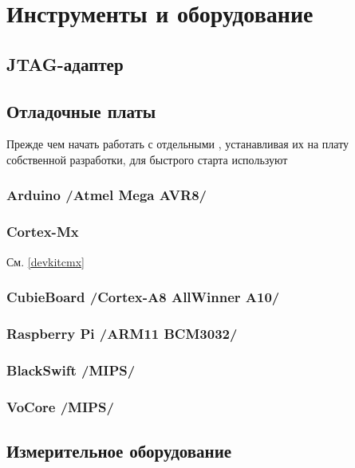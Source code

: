 \chapter{Инструменты и оборудование}

\section{JTAG-адаптер}

% 
% 

\section{Отладочные платы}

Прежде чем начать работать с отдельными \mk, устанавливая их на плату
собственной разработки, для быстрого старта используют 

\subsection{Arduino /Atmel Mega AVR8/}

\subsection{Cortex-Mx} См. \ref{devkitcmx}

\subsection{CubieBoard /Cortex-A8 AllWinner A10/}

\subsection{Raspberry Pi /ARM11 BCM3032/}

\subsection{BlackSwift /MIPS/}

\subsection{VoCore /MIPS/}



\section{Измерительное оборудование}

